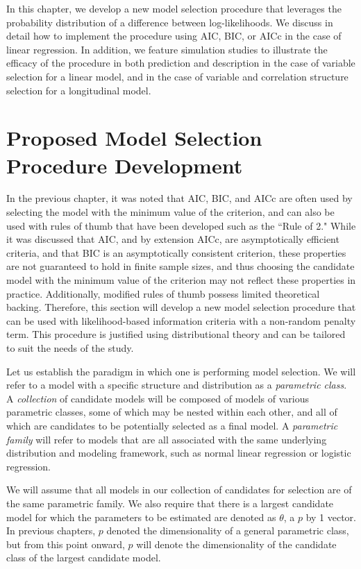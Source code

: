 \doublespace		
{}
		In this chapter, we develop a new model selection procedure that leverages the probability distribution of a difference between log-likelihoods. We discuss in detail how
		to implement the procedure using AIC, BIC, or AICc in the case of linear regression.  In addition, we feature simulation studies to illustrate the efficacy of the procedure
		in both prediction and description in the case of variable selection for a linear model, and in the case of variable and correlation structure selection for a longitudinal model.

		\section{Proposed Model Selection Procedure Development} \label{sec:proposed_method}
		In the previous chapter, it was noted that AIC, BIC, and AICc are often used by selecting the model with the minimum value of the criterion, and can also be used with
		rules of thumb that have been developed such as the ``Rule of 2." While it was discussed that AIC, and by extension AICc, are asymptotically efficient criteria,
		and that BIC is an asymptotically consistent criterion, these properties are not guaranteed to hold in finite sample sizes, and thus choosing the candidate model with
		the minimum value of the criterion may not reflect these properties in practice. Additionally, modified rules of thumb possess limited theoretical backing. Therefore,
		this section will develop a new model selection procedure that can be used with likelihood-based information criteria with a non-random penalty term. This procedure is justified
		using distributional theory and can be tailored to suit the needs of the study.
		
		Let us establish the paradigm in which one is performing model selection. We will refer to a model with a specific structure and distribution as a \textit{parametric class}.
		A \textit{collection} of candidate models will be composed of models of various parametric classes, some of which may be nested within each other, and all of which are candidates
		to be potentially selected as a final model. A \textit{parametric family} will refer to models that are all associated with the same underlying distribution and modeling framework, such as normal linear
		regression or logistic regression.
		
		We will assume that all models in our collection of candidates for selection are of the same parametric family. We also require that there is a largest candidate model
		for which the parameters to be estimated are denoted as $\theta$, a $p$ by 1 vector. In previous chapters, $p$ denoted the dimensionality of a general parametric class,
		but from this point onward, $p$ will denote the dimensionality of the candidate class of the largest candidate model.

